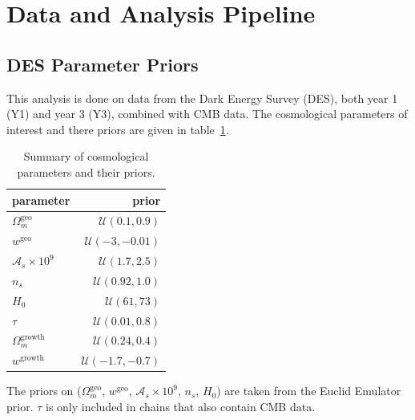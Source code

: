 \section{Data and Analysis Pipeline}
\subsection{DES Parameter Priors}
This analysis is done on data from the Dark Energy Survey (DES), both year 1 (Y1) and year 3 (Y3), combined with CMB data. The cosmological parameters of interest and there priors are given in table~\ref{table:cosmo_prior}.
\begin{table}
\centering
\begin{tabular}{lr}
	\hline
	parameter & prior \\
	\hline\hline
	$\Omega_m^{\text{geo}}$    & $\mathcal{U}(0.1,0.9)$   \\
	$w^{\mathrm{geo}}$         & $\mathcal{U}(-3,-0.01)$  \\
	$\mathcal{A}_s\times10^9$  & $\mathcal{U}(1.7,2.5)$   \\
	$n_s$                      & $\mathcal{U}(0.92,1.0)$  \\
	$H_0$                      & $\mathcal{U}(61,73)$     \\
	$\tau$                     & $\mathcal{U}(0.01,0.8)$  \\
	$\Omega_m^{\text{growth}}$ & $\mathcal{U}(0.24,0.4)$  \\
	$w^{\mathrm{growth}}$      & $\mathcal{U}(-1.7,-0.7)$ \\
	\hline
\end{tabular}
\caption{Summary of cosmological parameters and their priors.}
\label{table:cosmo_prior}
\end{table}
The priors on ($\Omega_m^{\text{geo}}$, $w^{\mathrm{geo}}$, $\mathcal{A}_s\times10^9$, $n_s$, $H_0$) are taken from the Euclid Emulator prior. $\tau$ is only included in chains that also contain CMB data.
